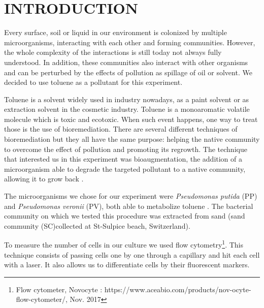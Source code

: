 \documentclass[a4paper, 10pt, conference]{ieeeconf}   %
\begin{document}
\section{INTRODUCTION}


Every surface, soil or liquid in our environment is colonized by multiple microorganisms, interacting with each other and forming communities. However, the whole complexity of the interactions is still today not always fully understood.
In addition, these communities also interact with other organisms and can be perturbed by the effects of pollution as spillage of oil or solvent. We decided to use toluene as a pollutant for this experiment.

Toluene is a solvent widely used in industry nowadays, as a paint solvent or as extraction solvent in the cosmetic industry. Toluene is a monoaromatic volatile molecule which is toxic and ecotoxic\cite{toluene}. 
When such event happens, one way to treat those is the use of bioremediation. There are several different techniques of bioremediation but they all have the same purpose: helping the native community to overcome the effect of pollution and promoting its regrowth. The technique that interested us in this experiment was bioaugmentation, the addition of a microorganism able to degrade the targeted pollutant to a native community, allowing it to grow back \cite{Bioremediation}.

The microorganisms we chose for our experiment were \textit{Pseudomonas putida} (PP) and \textit{Pseudomonas veronii} (PV), both able to metabolize toluene \cite{pseudomonas_putida} \cite{Pseudomonas_Veronii}. The bacterial community on which we tested this procedure was extracted from sand (sand community (SC)collected at St-Sulpice beach, Switzerland).

To measure the number of cells in our culture we used flow cytometry\footnote{Flow cytometer, Novocyte : https://www.aceabio.com/products/nov-ocyte-flow-cytometer/, Nov. 2017}. This technique consists of passing cells one by one through a capillary and hit each cell with a laser. It also allows us to differentiate cells by their fluorescent markers.
\end{document}
